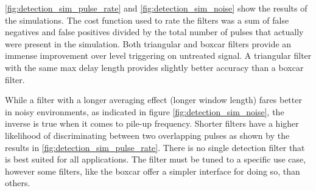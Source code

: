 \autoref{fig:detection_sim_pulse_rate} and \autoref{fig:detection_sim_noise}
show the results of the simulations. The cost function used to rate the 
filters was a sum of false negatives and false positives divided by the 
total number of pulses that actually were present in the simulation.
Both triangular and boxcar filters provide an immense improvement over
level triggering on untreated signal. A triangular filter
with the same max delay length provides slightly better accuracy 
than a boxcar filter.


While a filter with a longer averaging effect (longer window length) 
fares better in noisy environments, as indicated in figure
\autoref{fig:detection_sim_noise}, the inverse is true when 
it comes to pile-up frequency. Shorter filters have a higher likelihood
of discriminating between two overlapping pulses as shown 
by the results in \autoref{fig:detection_sim_pulse_rate}.
There is no single detection filter that is best suited for all applications.
The filter must be tuned to a specific use case, however
some filters, like the boxcar offer a simpler interface for
doing so, than others.


